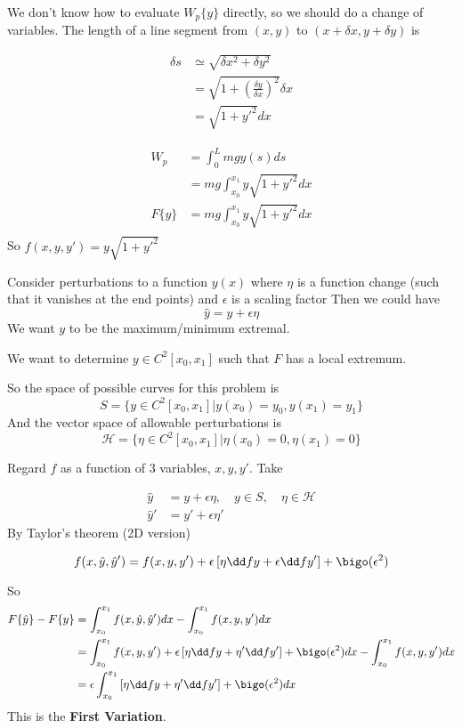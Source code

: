 \documentclass{E:/Documents/Latex/myassignment}
\begin{document}
We don't know how to evaluate $W_p\{y\}$ directly, so we should do a change of variables. The length of a line segment from $(x,y)$ to $(x+\delta x, y+\delta y)$ is

\begin{align*}
	\delta s &\simeq \sqrt{\delta x^2 + \delta y^2}\\
	&= \sqrt{1 + \left(\frac{\delta y}{\delta x}\right)^2 } \delta x\\
	&= \sqrt{1 + y'^2} dx
\end{align*}


\begin{align*}
	W_p &= \int_0^L mgy(s) ds\\
	&= mg \int_{x_0}^{x_1} y\sqrt{1+y'^2} dx\\
	F\{y\} &= mg \int_{x_0}^{x_1} y\sqrt{1+y'^2} dx\\
\end{align*}
So $f(x,y,y') = y\sqrt{1+y'^2} $

Consider perturbations to a function $y(x)$ where $\eta$ is a function change (such that it vanishes at the end points) and $\epsilon$ is a scaling factor
Then we could have
\[\hat{y} = y + \epsilon \eta\]
We want $y$ to be the maximum/minimum extremal.

We want to determine $y \in C^2[x_0,x_1]$ such that $F$ has a local extremum.

So the space of possible curves for this problem is
\[S = \{y \in C^2 [x_0,x_1] | y(x_0) = y_0, y(x_1) = y_1\}\]
And the vector space of allowable perturbations is
\[\mathcal{H} = \{\eta \in C^2 [x_0,x_1] | \eta(x_0) = 0, \eta(x_1) = 0\}\]

Regard $f$ as a function of $3$ variables, $x,y,y'$.
Take 

\begin{align*}
	\hat{y} &= y + \epsilon \eta, \quad y\in S, \quad \eta \in \mathcal{H}\\
	\hat{y}' &= y' + \epsilon \eta'	
\end{align*}
By Taylor's theorem (2D version)

\[f(x,\hat{y},\hat{y}') = f(x,y,y') + \epsilon \left[\eta \dd fy + \epsilon \dd f{y'}\right] +\bigo(\epsilon^2)\]

So
\begin{align*}
	F\{\hat{y}\} - F\{y\} &= \int_{x_0}^{x_1} f(x,\hat{y},\hat{y}') dx - \int_{x_0}^{x_1} f(x,y,y') dx\\
	&=\int_{x_0}^{x_1} f(x,y,y') + \epsilon \left[\eta \dd fy + \eta' \dd f{y'}\right] +\bigo(\epsilon^2) dx - \int_{x_0}^{x_1} f(x,y,y') dx\\
	&=\epsilon \int_{x_0}^{x_1}\left[\eta \dd fy + \eta' \dd f{y'}\right] +\bigo(\epsilon^2) dx\\ 
\end{align*}
This is the \textbf{First Variation}.
\end{document}
